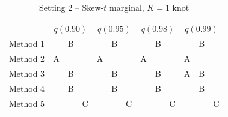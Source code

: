 \documentclass[11pt]{article}
\begin{document}

\begin{table}[htbp]
  \centering
  \caption{Setting 2 -- Skew-$t$ marginal, $K = 1$ knot}
  \label{tbl:st1sim}
  \begin{tabular}{|l|ccc|ccc|ccc|ccc|}
    \cline{2-13}
    \multicolumn{1}{c}{} & \multicolumn{3}{|c}{$q(0.90)$} & \multicolumn{3}{|c}{$q(0.95)$} & \multicolumn{3}{|c}{$q(0.98)$} & \multicolumn{3}{|c|}{$q(0.99)$} \\
    \hline
    Method 1 &   & B &   &   & B &   &   & B &   &   & B &   \\
    \hline
    Method 2 & A &   &   & A &   &   & A &   &   & A &   &   \\
    \hline
    Method 3 &   & B &   &   & B &   &   & B &   & A & B &   \\
    \hline
    Method 4 &   & B &   &   & B &   &   & B &   &   & B &   \\
    \hline
    Method 5 &   &   & C &   &   & C &   &   & C &   &   & C \\
    \hline
  \end{tabular}
\end{table}
\end{document}
